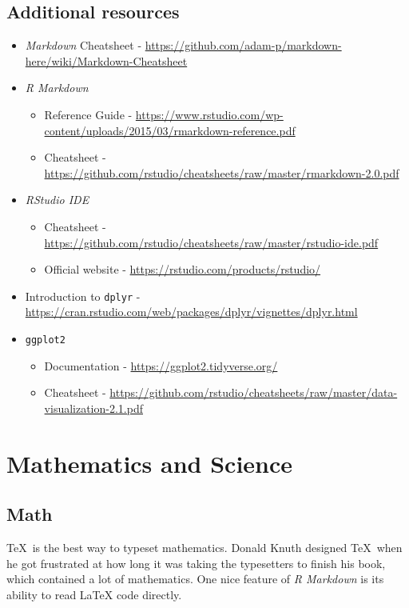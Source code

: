 \documentclass[12pt,twoside]{reedthesis}
\providecommand{\tightlist}{%
  \setlength{\itemsep}{0pt}\setlength{\parskip}{0pt}}
\begin{document}
\hypertarget{additional-resources}{%
\section{Additional resources}\label{additional-resources}}
\begin{itemize}
\item
  \emph{Markdown} Cheatsheet - \url{https://github.com/adam-p/markdown-here/wiki/Markdown-Cheatsheet}
\item
  \emph{R Markdown}
  \begin{itemize}
  \tightlist
  \item
    Reference Guide - \url{https://www.rstudio.com/wp-content/uploads/2015/03/rmarkdown-reference.pdf}
  \item
    Cheatsheet - \url{https://github.com/rstudio/cheatsheets/raw/master/rmarkdown-2.0.pdf}
  \end{itemize}
\item
  \emph{RStudio IDE}
  \begin{itemize}
  \tightlist
  \item
    Cheatsheet - \url{https://github.com/rstudio/cheatsheets/raw/master/rstudio-ide.pdf}
  \item
    Official website - \url{https://rstudio.com/products/rstudio/}
  \end{itemize}
\item
  Introduction to \texttt{dplyr} - \url{https://cran.rstudio.com/web/packages/dplyr/vignettes/dplyr.html}
\item
  \texttt{ggplot2}
  \begin{itemize}
  \tightlist
  \item
    Documentation - \url{https://ggplot2.tidyverse.org/}
  \item
    Cheatsheet - \url{https://github.com/rstudio/cheatsheets/raw/master/data-visualization-2.1.pdf}
  \end{itemize}
\end{itemize}
\hypertarget{math-sci}{%
\chapter{Mathematics and Science}\label{math-sci}}

\hypertarget{math}{%
\section{Math}\label{math}}

\TeX~is the best way to typeset mathematics. Donald Knuth designed \TeX~when he got frustrated at how long it was taking the typesetters to finish his book, which contained a lot of mathematics. One nice feature of \emph{R Markdown} is its ability to read LaTeX code directly.
\end{document}
